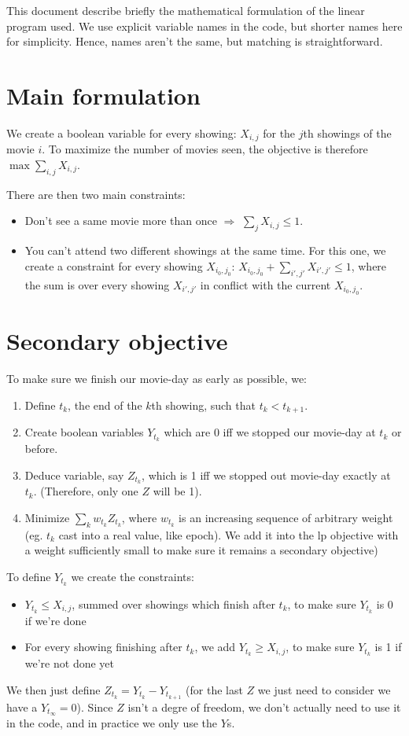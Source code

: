 \documentclass[a4paper, 10pt]{article}
\begin{document}
This document describe briefly the mathematical formulation of the linear program used. We use explicit variable names in the code, but shorter names here for simplicity. Hence, names aren't the same, but matching is straightforward.

\section{Main formulation}
We create a boolean variable for every showing: $X_{i,j}$ for the $j$th showings of the movie $i$.
To maximize the number of movies seen, the objective is therefore $\max \sum_{i,j} X_{i,j}$.

There are then two main constraints:
\begin{itemize}
  \item Don't see a same movie more than once $\Rightarrow$ $\sum_j X_{i,j} \leq 1$.
  \item You can't attend two different showings at the same time. For this one, we create a constraint for every showing $X_{i_0,j_0}$: $X_{i_0,j_0} + \sum_{i',j'} X_{i',j'} \leq 1$, where the sum is over every showing $X_{i',j'}$ in conflict with the current $X_{i_0,j_0}$. 
\end{itemize}

\section{Secondary objective}
To make sure we finish our movie-day as early as possible, we:
\begin{enumerate}
  \item Define $t_k$, the end of the $k$th showing, such that $t_k < t_{k+1}$. 
  \item Create boolean variables $Y_{t_k}$ which are 0 iff we stopped our movie-day at $t_k$ or before.
  \item Deduce variable, say $Z_{t_k}$, which is 1 iff we stopped out movie-day exactly at $t_k$. (Therefore, only one $Z$ will be 1).
  \item Minimize $\sum_k w_{t_k} Z_{t_k}$, where $w_{t_k}$ is an increasing sequence of arbitrary weight (eg. $t_k$ cast into a real value, like epoch). We add it into the lp objective with a weight sufficiently small to make sure it remains a secondary objective)
\end{enumerate}

To define $Y_{t_k}$ we create the constraints:
\begin{itemize}
  \item $Y_{t_k} \leq X_{i,j}$, summed over showings which finish after $t_k$, to make sure $Y_{t_k}$ is 0 if we're done
  \item For every showing finishing after $t_k$, we add $Y_{t_k} \geq X_{i,j}$, to make sure $Y_{t_k}$ is 1 if we're not done yet
\end{itemize}

We then just define $Z_{t_k} = Y_{t_k} - Y_{t_{k+1}}$ (for the last $Z$ we just need to consider we have a $Y_{t_\infty} = 0$).
Since $Z$ isn't a degre of freedom, we don't actually need to use it in the code, and in practice we only use the $Y$s.
\end{document}
